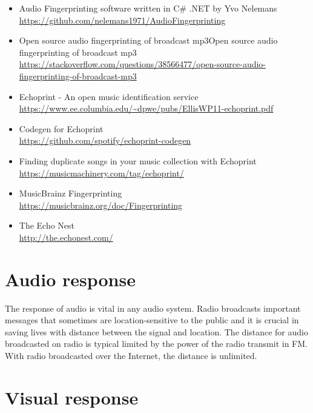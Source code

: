 \documentclass[a4paper,norsk,utf8]{report}
\begin{document}
    \begin{itemize}
      \item Audio Fingerprinting software written in C# .NET by Yvo Nelemans\\
        \url{https://github.com/nelemans1971/AudioFingerprinting}
      \item Open source audio fingerprinting of broadcast mp3Open source audio fingerprinting of broadcast mp3\\
        \url{https://stackoverflow.com/questions/38566477/open-source-audio-fingerprinting-of-broadcast-mp3}\\
      \item Echoprint - An open music identification service\\
        \url{https://www.ee.columbia.edu/~dpwe/pubs/EllisWP11-echoprint.pdf}\\
      \item Codegen for Echoprint\\
        \url{https://github.com/spotify/echoprint-codegen}\\
      \item Finding duplicate songs in your music collection with Echoprint\\
        \url{https://musicmachinery.com/tag/echoprint/}\\
      \item MusicBrainz Fingerprinting\\
        \url{https://musicbrainz.org/doc/Fingerprinting}\\
      \item The Echo Nest\\
        \url{http://the.echonest.com/}
    \end{itemize}

\chapter{Audio response}

    The response of audio is vital in any audio system.  Radio
    broadcasts important messages that sometimes are
    location-sensitive to the public and it is crucial in saving lives
    with distance between the signal and location.  The distance for
    audio broadcasted on radio is typical limited by the power of the
    radio transmit in FM.  With radio broadcasted over the Internet,
    the distance is unlimited.

\chapter{Visual response}
\end{document}
